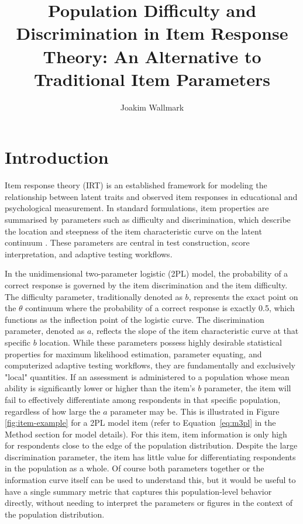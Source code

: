 \documentclass[man, 12pt, floatsintext]{apa7}
\title{Population Difficulty and Discrimination in Item Response Theory: An Alternative to Traditional Item Parameters}
\author{Joakim Wallmark}
\affiliation{Department of statistics, USBE, Umeå University}
\begin{document}
\maketitle

\section{Introduction}

Item response theory (IRT) is an established framework for modeling the relationship between latent traits and observed item responses in educational and psychological measurement. In standard formulations, item properties are summarised by parameters such as difficulty and discrimination, which describe the location and steepness of the item characteristic curve on the latent continuum \parencite{Birnbaum1968,Embretson2000,Lord1980,Baker2004}. These parameters are central in test construction, score interpretation, and adaptive testing workflows.

In the unidimensional two-parameter logistic (2PL) model, the probability of a correct response is governed by the item discrimination and the item difficulty. The difficulty parameter, traditionally denoted as $b$, represents the exact point on the $\theta$ continuum where the probability of a correct response is exactly 0.5, which functions as the inflection point of the logistic curve. The discrimination parameter, denoted as $a$, reflects the slope of the item characteristic curve at that specific $b$ location. While these parameters possess highly desirable statistical properties for maximum likelihood estimation, parameter equating, and computerized adaptive testing workflows, they are fundamentally and exclusively "local" quantities. If an assessment is administered to a population whose mean ability is significantly lower or higher than the item's $b$ parameter, the item will fail to effectively differentiate among respondents in that specific population, regardless of how large the $a$ parameter may be. This is illustrated in Figure \ref{fig:item-example} for a 2PL model item (refer to Equation~\ref{eq:m3pl} in the Method section for model details). For this item, item information is only high for respondents close to the edge of the population distribution. Despite the large discrimination parameter, the item has little value for differentiating respondents in the population as a whole. Of course both parameters together or the information curve itself can be used to understand this, but it would be useful to have a single summary metric that captures this population-level behavior directly, without needing to interpret the parameters or figures in the context of the population distribution.
\end{document}
